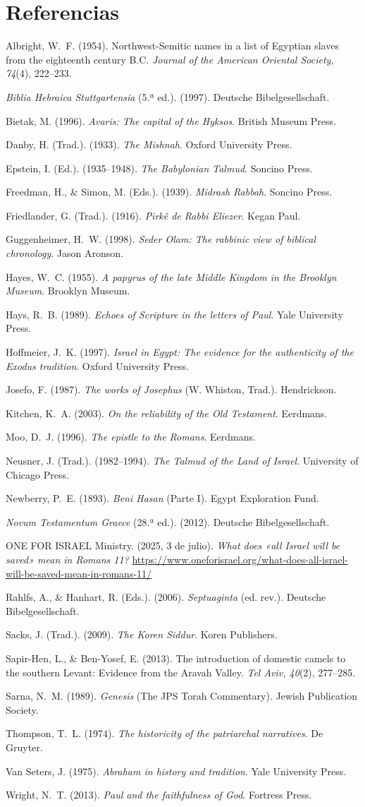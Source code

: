\documentclass[11pt,letterpaper]{article}
\newcommand{\refapa}[1]{\par{\RaggedRight\hangindent=1.27cm\hangafter=1\noindent #1\par}\vspace{4pt}}
\begin{document}
\section*{Referencias}
\refapa{Albright, W.~F. (1954). Northwest-Semitic names in a list of Egyptian slaves from the eighteenth century B.C. \emph{Journal of the American Oriental Society, 74}(4), 222--233.}
\refapa{\emph{Biblia Hebraica Stuttgartensia} (5.ª ed.). (1997). Deutsche Bibelgesellschaft.}
\refapa{Bietak, M. (1996). \emph{Avaris: The capital of the Hyksos}. British Museum Press.}
\refapa{Danby, H. (Trad.). (1933). \emph{The Mishnah}. Oxford University Press.}
\refapa{Epstein, I. (Ed.). (1935--1948). \emph{The Babylonian Talmud}. Soncino Press.}
\refapa{Freedman, H., \& Simon, M. (Eds.). (1939). \emph{Midrash Rabbah}. Soncino Press.}
\refapa{Friedlander, G. (Trad.). (1916). \emph{Pirkê de Rabbi Eliezer}. Kegan Paul.}
\refapa{Guggenheimer, H.~W. (1998). \emph{Seder Olam: The rabbinic view of biblical chronology}. Jason Aronson.}
\refapa{Hayes, W.~C. (1955). \emph{A papyrus of the late Middle Kingdom in the Brooklyn Museum}. Brooklyn Museum.}
\refapa{Hays, R.~B. (1989). \emph{Echoes of Scripture in the letters of Paul}. Yale University Press.}
\refapa{Hoffmeier, J.~K. (1997). \emph{Israel in Egypt: The evidence for the authenticity of the Exodus tradition}. Oxford University Press.}
\refapa{Josefo, F. (1987). \emph{The works of Josephus} (W. Whiston, Trad.). Hendrickson.}
\refapa{Kitchen, K.~A. (2003). \emph{On the reliability of the Old Testament}. Eerdmans.}
\refapa{Moo, D.~J. (1996). \emph{The epistle to the Romans}. Eerdmans.}
\refapa{Neusner, J. (Trad.). (1982--1994). \emph{The Talmud of the Land of Israel}. University of Chicago Press.}
\refapa{Newberry, P.~E. (1893). \emph{Beni Hasan} (Parte I). Egypt Exploration Fund.}
\refapa{\emph{Novum Testamentum Graece} (28.ª ed.). (2012). Deutsche Bibelgesellschaft.}
\refapa{ONE FOR ISRAEL Ministry. (2025, 3 de julio). \emph{What does «all Israel will be saved» mean in Romans 11?} \url{https://www.oneforisrael.org/what-does-all-israel-will-be-saved-mean-in-romans-11/}}
\refapa{Rahlfs, A., \& Hanhart, R. (Eds.). (2006). \emph{Septuaginta} (ed. rev.). Deutsche Bibelgesellschaft.}
\refapa{Sacks, J. (Trad.). (2009). \emph{The Koren Siddur}. Koren Publishers.}
\refapa{Sapir-Hen, L., \& Ben-Yosef, E. (2013). The introduction of domestic camels to the southern Levant: Evidence from the Aravah Valley. \emph{Tel Aviv, 40}(2), 277--285.}
\refapa{Sarna, N.~M. (1989). \emph{Genesis} (The JPS Torah Commentary). Jewish Publication Society.}
\refapa{Thompson, T.~L. (1974). \emph{The historicity of the patriarchal narratives}. De Gruyter.}
\refapa{Van Seters, J. (1975). \emph{Abraham in history and tradition}. Yale University Press.}
\refapa{Wright, N.~T. (2013). \emph{Paul and the faithfulness of God}. Fortress Press.}
\end{document}
